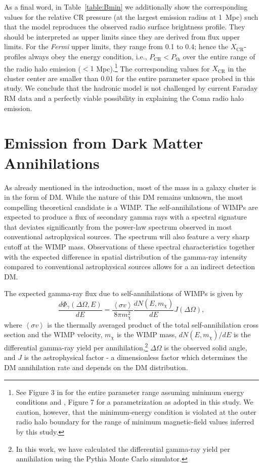 \documentclass[12pt,manuscript]{aastex}
\newcommand{\expval}[1]{\left\langle #1 \right\rangle}
\newcommand{\CR}{\mathrm{CR}}
\begin{document}
As a final word, in Table~\ref{table:Bmin} we additionally show the corresponding values for the
relative CR pressure (at the largest emission radius at 1~Mpc) such that the model reproduces the
observed radio surface brightness profile. They should be interpreted as upper limits since they
are derived from flux upper limits. For the {\em Fermi} upper limits, they range from 0.1 to 0.4;
hence the $X_{\CR}$-profiles always obey the energy condition, i.e., $P_{\CR} < P_{\mathrm{th}}$
over the entire range of the radio halo emission ($< 1$ Mpc).\footnote{See Figure 3 in
\citet{article:PfrommerEnsslin:2004a} for the entire parameter range assuming minimum energy
conditions and \citet{article:PfrommerEnsslin:2004b}, Figure 7 for a parametrization as adopted in
this study.  We caution, however, that the minimum-energy condition is violated at the outer radio
halo boundary for the range of minimum magnetic-field values inferred by this study.} The
corresponding values for $X_\CR$ in the cluster center are smaller than 0.01 for the entire
parameter space probed in this study. We conclude that the hadronic model is not challenged by
current Faraday RM data and a perfectly viable possibility in explaining the Coma radio halo
emission.

%
%

\section{Emission from Dark Matter Annihilations}
As already mentioned in the introduction, most of the mass in a galaxy cluster is in the form of
DM. While the nature of this DM remains unknown, the most compelling theoretical candidate is a
WIMP. The self-annihilations of WIMPs are expected to produce a flux of secondary gamma rays with a
spectral signature that deviates significantly from the power-law spectrum observed in most
conventional astrophysical sources. The spectrum will also feature a very sharp cutoff at the WIMP
mass. Observations of these spectral characteristics together with the expected difference in spatial
distribution of the gamma-ray intensity compared to conventional astrophysical sources allows for a
an indirect detection DM.

The expected gamma-ray flux due to self-annihilations of WIMPs is given by 
\begin{equation}
\frac{d\Phi_{\gamma}(\Delta\Omega,E)}{dE}=
\frac{\expval{\sigma v}}{8\pi m_{\chi}^{2}}\frac{dN(E,m_{\chi})}{dE} J(\Delta\Omega),
\label{eqn:WIMPflux}
\end{equation}
where $\expval{\sigma v}$ is the thermally averaged product of the total self-annihilation cross
section and the WIMP velocity, $m_{\chi}$ is the WIMP mass, $dN(E,m_{\chi})/dE$ is the differential
gamma-ray yield per annihilation,\footnote{In this work, we have calculated the differential
gamma-ray yield per annihilation using the Pythia Monte Carlo simulator.} $\Delta\Omega$ is the
observed solid angle, and $J$ is the astrophysical factor - a dimensionless factor which determines
the DM annihilation rate and depends on the DM distribution.
\end{document}
